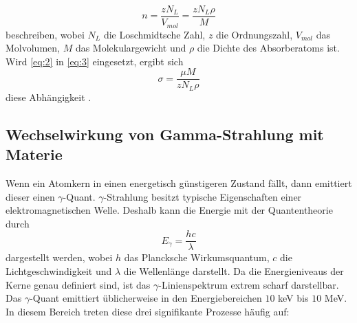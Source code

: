 \begin{equation}
  n= \frac{z N_{L}}{V_{mol}}= \frac{z N_{L} \rho}{M}
  \label{eq:3}
\end{equation}
beschreiben, wobei $N_{L}$ die Loschmidtsche Zahl, $z$ die Ordnungszahl, $V_{mol}$ das Molvolumen, $M$ das Molekulargewicht und $\rho$ die Dichte des Absorberatoms ist. Wird \eqref{eq:2} in \eqref{eq:3} eingesetzt, ergibt sich 
\begin{equation}
  \sigma=\frac{\mu M}{z N_{L}\rho}
  \label{eq:4}
\end{equation}
diese Abhängigkeit \cite{sample}.

\subsection{Wechselwirkung von Gamma-Strahlung mit Materie}
Wenn ein Atomkern in einen energetisch günstigeren Zustand fällt, dann emittiert dieser einen $\gamma$-Quant. $\gamma$-Strahlung besitzt typische Eigenschaften einer elektromagnetischen Welle. Deshalb kann die Energie mit der Quantentheorie durch
\begin{equation*}
  E_{\gamma}=\frac{hc}{\lambda}
\end{equation*}
dargestellt werden, wobei $h$ das Plancksche Wirkumsquantum, $c$ die Lichtgeschwindigkeit und $\lambda$ die Wellenlänge darstellt. Da die Energieniveaus der Kerne genau definiert sind, ist das $\gamma$-Linienspektrum extrem scharf darstellbar. \\
Das $\gamma$-Quant emittiert üblicherweise in den Energiebereichen $10$ keV bis $10$ MeV. In diesem Bereich treten diese drei signifikante Prozesse häufig auf:
